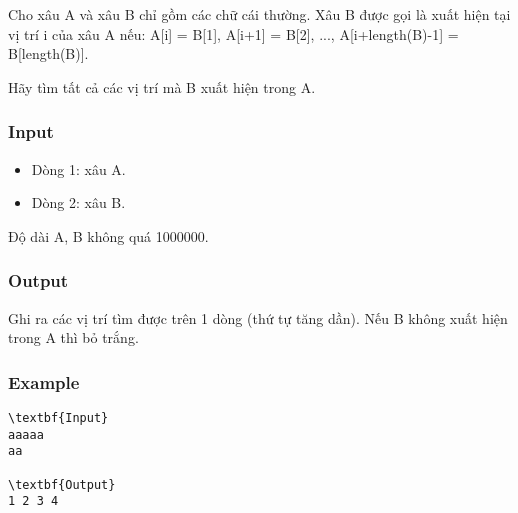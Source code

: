 

Cho xâu A và xâu B chỉ gồm các chữ cái thường. Xâu B được gọi là xuất hiện tại vị trí i của xâu A nếu: A[i] = B[1], A[i+1] = B[2], ..., A[i+length(B)-1] = B[length(B)].

Hãy tìm tất cả các vị trí mà B xuất hiện trong A.

\subsubsection{Input}
\begin{itemize}
	\item Dòng 1: xâu A.
	\item Dòng 2: xâu B.
\end{itemize}

Độ dài A, B không quá 1000000.

\subsubsection{Output}

Ghi ra các vị trí tìm được trên 1 dòng (thứ tự tăng dần). Nếu B không xuất hiện trong A thì bỏ trắng.

\subsubsection{Example}
\begin{verbatim}
\textbf{Input}
aaaaa
aa

\textbf{Output}
1 2 3 4
\end{verbatim}
